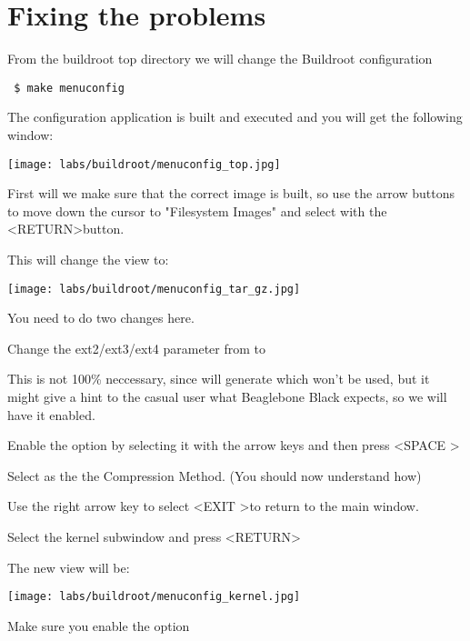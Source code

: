 \section{Fixing the problems}

From the buildroot top directory  we will
change the Buildroot configuration

{\small
{\tt
\$ make menuconfig
}
}

The configuration application is built and executed and you will get
the following window:

\begin{center}
\texttt{[image: labs/buildroot/menuconfig\_top.jpg]}
\end{center}

First will we make sure that the correct image is built,
so use the arrow buttons to move down the cursor to "Filesystem Images"
and select with the \textless RETURN\textgreater button.


\clearpage
This will change the view to:

\begin{center}
\texttt{[image: labs/buildroot/menuconfig\_tar\_gz.jpg]}
\end{center}

You need to do two changes here.

Change the ext2/ext3/ext4 parameter from  to 

This is not 100\% neccessary, since will generate 
which won't be used, but it might give a hint to the casual user what
Beaglebone Black expects, so we will have it enabled.

Enable the  option by selecting
it with the arrow keys and then press \textless SPACE \textgreater

Select  as the the Compression Method. (You should now understand how)

Use the right arrow key to select  \textless EXIT \textgreater to return
to the main window.

Select the kernel subwindow and press \textless RETURN\textgreater

\clearpage
The new view will be:

\begin{center}
\texttt{[image: labs/buildroot/menuconfig\_kernel.jpg]}
\end{center}

Make sure you enable the  option

